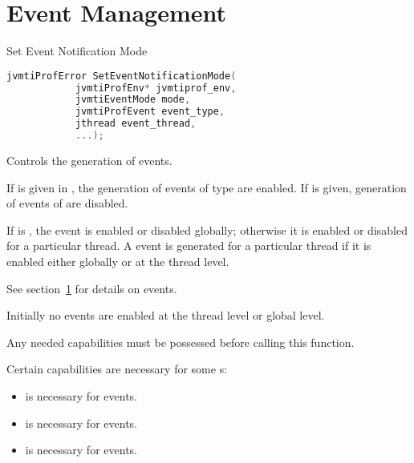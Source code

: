
\section{Event Management} \label{sec:eventmgr}

\begin{apidef}{Set Event Notification Mode}
\begin{lstlisting}[language=C]
jvmtiProfError SetEventNotificationMode(
            jvmtiProfEnv* jvmtiprof_env,
            jvmtiEventMode mode,
            jvmtiProfEvent event_type,
            jthread event_thread,
            ...);
\end{lstlisting}

\begin{apidesc}
Controls the generation of events.

If  is given in , the generation of events of type  are enabled. If  is given, generation of events of  are disabled.

If  is , the event is enabled or disabled globally; otherwise it is enabled or disabled for a particular thread. A event is generated for a particular thread if it is enabled either globally or at the thread level.

See section~\ref{sec:eventmgr} for details on events.


Initially no events are enabled at the thread level or global level.

Any needed capabilities must be possessed before calling this function.
\end{apidesc}

\begin{apiphase}
\apiphaseonloadlive
\end{apiphase}

\begin{apicap}
\apicaprequired

Certain capabilities are necessary for some s:
\begin{itemize}
\item {} is necessary for  events.
\item {} is necessary for  events.
\item {} is necessary for  events.
\end{itemize}
\end{apicap}


\end{apidef}
